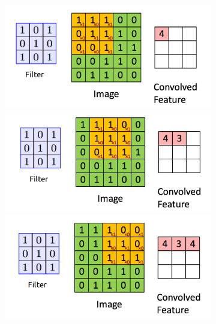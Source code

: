 \documentclass{article}
\begin{document}
\begin{figure}[H]

\begin{figure}[H]
  \includegraphics[width=\linewidth]{img/conv1.png}
\endminipage\hfill
{}
  \includegraphics[width=\linewidth]{img/conv2.png}
\endminipage\hfill
{}%
  \includegraphics[width=\linewidth]{img/conv3.png}
\endminipage
\end{figure}


\end{figure}
\end{document}
